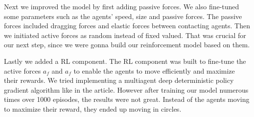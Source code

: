 \documentclass[9pt]{pnas-new}
\begin{document}
Next we improved the model by first adding passive forces. We also fine-tuned some parameters such as the agents' speed, size and passive forces. 
The passive forces included dragging forces and elastic forces between contacting agents.
Then we initiated active forces as random instead of fixed valued. That was crucial for our next step, since we were gonna build our reinforcement model based on them.

Lastly we added a RL component. The RL component was built to fine-tune the active forces $a_f$ and $a_f$ to enable the agents to move efficiently and maximize their rewards. We tried implementing a multiagent deep deterministic policy gradient algorithm like in the article. However after training our model numerous times over 1000 episodes, the results were not great. Instead of the agents moving to maximize their reward, they ended up moving in circles.
\end{document}
